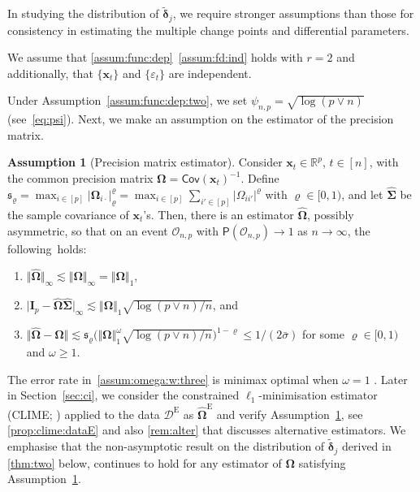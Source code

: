 \documentclass[11pt, a4paper]{article}
\newcommand{\mbf}{\mathbf}
\newcommand{\mc}{\mathcal}
\newcommand{\vep}{\varepsilon}
\def\wh{\widehat}
\def\wc{\widetilde}
\newcommand{\Cov}[0]{\mathsf{Cov}}
\newcommand{\p}{\mathsf{P}}
\newcommand{\R}{\mathbb{R}}
\newcommand{\tE}{\text{E}}
\theoremstyle{definition}
\theoremstyle{definition}
\theoremstyle{definition}
\theoremstyle{definition}
\theoremstyle{definition}
\newtheorem{assum}{Assumption}
\theoremstyle{remark}
\theoremstyle{definition}
\theoremstyle{definition}
\theoremstyle{definition}
\newenvironment{massum}[1]{%
  \renewcommand\themassuminner{#1}%
  \massuminner
}{\endmassuminner}
\begin{document}
In studying the distribution of $\wc{\bm\delta}_j$, we require stronger assumptions than those for consistency in estimating the multiple change points and differential parameters. 

\begin{massum}{\ref{assum:func:dep}$^\prime$}[Independence, sub-Gaussianity]
\label{assum:func:dep:two}
We assume that \cref{assum:func:dep}~\ref{assum:fd:ind} holds with $r = 2$ and additionally, that $\{\mbf x_t\}$ and $\{\vep_t\}$ are independent.
\end{massum}

Under Assumption~\ref{assum:func:dep:two}, we set $\psi_{n, p}  = \sqrt{\log(p \vee n)}$ (see~\eqref{eq:psi}).
Next, we make an assumption on the estimator of the precision matrix.
\begin{assum}[Precision matrix estimator]
\label{assum:omega:w}
Consider $\mbf x_t \in \R^p$, $t \in [n]$, with the common precision matrix $\bm\Omega = \Cov(\mbf x_t)^{-1}$. Define $\mathfrak{s}_{\varrho} = \max_{i \in [p]} \vert \bm\Omega_{i\cdot} \vert_{\varrho}^{\varrho} = \max_{i \in [p]} \sum_{i' \in [p]} \vert \Omega_{ii'} \vert^{\varrho}$ with $\varrho \in [0, 1)$, and let $\wh{\bm\Sigma}$ be the sample covariance of $\mbf x_t$'s. Then, there is an estimator $\wh{\bm\Omega}$, possibly asymmetric, so that on an event $\mc{O}_{n, p}$ with $\p(\mc O_{n, p}) \to 1$ as $n \to \infty$, the following~holds:
\begin{enumerate}[label = (\roman*)]
    \item \label{assum:omega:w:one} $\Vert \wh{\bm\Omega} \Vert_\infty \lesssim \Vert \bm\Omega \Vert_\infty = \Vert \bm\Omega \Vert_1$, 
    \item \label{assum:omega:w:two} $\vert \mbf I_p - \wh{\bm\Omega} \wh{\bm\Sigma} \vert_\infty  \lesssim {\Vert \bm\Omega \Vert_1 \sqrt{\log(p \vee n)/n}}$, and
    \item \label{assum:omega:w:three} $\Vert \wh{\bm\Omega} - \bm\Omega \Vert \lesssim \mathfrak{s}_\varrho \bigl({\Vert \bm\Omega \Vert_1^{\omega}\sqrt{\log(p \vee n)/n}}\bigr)^{1 - \varrho}\le 1/(2\bar{\sigma})$ for some $\varrho \in [0, 1)$ and $\omega \ge 1$.
\end{enumerate}
\end{assum}


The error rate in~\ref{assum:omega:w:three} is minimax optimal when $\omega = 1$ \citep{cai2016estimating}. 
Later in Section~\ref{sec:ci}, we consider the constrained $\ell_1$-minimisation estimator (CLIME; \citealp{cai2011constrained}) applied to the data $\mc{D}^{\tE}$ as $\wh{\bm\Omega}^{\tE}$ and verify Assumption~\ref{assum:omega:w}, 
see \cref{prop:clime:dataE} and also \cref{rem:alter} that discusses alternative estimators. 
We emphasise that the non-asymptotic result on the distribution of $\wc{\bm\delta}_j$ derived in \cref{thm:two} below, continues to hold for any estimator of $\bm\Omega$ satisfying Assumption~\ref{assum:omega:w}.
\end{document}
